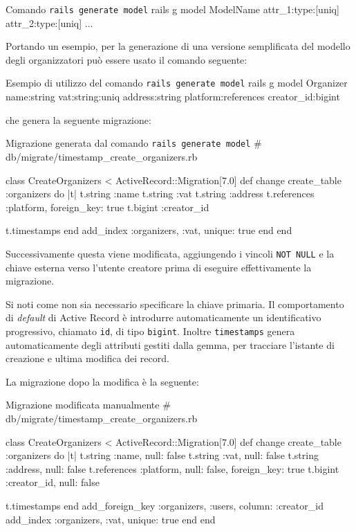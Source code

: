 \begin{code}[shell]{Comando \texttt{rails generate model}}
rails g model ModelName attr_1:type:[uniq] attr_2:type:[uniq] ...
\end{code}

\noindent Portando un esempio, per la generazione di una versione semplificata del modello degli organizzatori può essere usato il comando seguente:

\begin{code}[shell]{Esempio di utilizzo del comando \texttt{rails generate model}}
rails g model Organizer name:string vat:string:uniq address:string platform:references creator_id:bigint
\end{code}

\noindent che genera la seguente migrazione:

\begin{code}{Migrazione generata dal comando \texttt{rails generate model}}
# db/migrate/{timestamp}_create_organizers.rb

class CreateOrganizers < ActiveRecord::Migration[7.0]
	def change
	create_table :organizers do |t|
		t.string :name
		t.string :vat
		t.string :address
		t.references :platform, foreign_key: true
		t.bigint :creator_id

		t.timestamps
	end
	add_index :organizers, :vat, unique: true
	end
end
\end{code}

\noindent Successivamente questa viene modificata, aggiungendo i vincoli \verb|NOT NULL| e la chiave esterna verso l'utente creatore prima di eseguire effettivamente la migrazione.

Si noti come non sia necessario specificare la chiave primaria. Il comportamento di \emph{default} di Active Record è introdurre automaticamente un identificativo progressivo, chiamato \verb|id|, di tipo \verb|bigint|. Inoltre \verb|timestamps| genera automaticamente degli attributi gestiti dalla gemma, per tracciare l'istante di creazione e ultima modifica dei record.

La migrazione dopo la modifica è la seguente:
\begin{code}{Migrazione modificata manualmente}
# db/migrate/{timestamp}_create_organizers.rb

class CreateOrganizers < ActiveRecord::Migration[7.0]
  def change
    create_table :organizers do |t|
      t.string :name, null: false
      t.string :vat, null: false
      t.string :address, null: false
      t.references :platform, null: false, foreign_key: true
      t.bigint :creator_id, null: false

      t.timestamps
    end
    add_foreign_key :organizers, :users, column: :creator_id
    add_index :organizers, :vat, unique: true
  end
end
\end{code}

